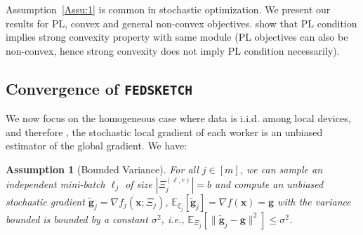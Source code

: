 \documentclass[11pt]{article}
\newtheorem{assumption}{Assumption}
\begin{document}
Assumption~\ref{Assu:1} is common in stochastic optimization. 
We present our results for PL, convex and general non-convex objectives. \citep{karimi2016linear} show that PL condition implies strong convexity property with same module (PL objectives can also be non-convex, hence strong convexity does not imply PL condition necessarily).

\vspace{-0.05in}
\subsection{Convergence of  \texttt{FEDSKETCH} } 
\vspace{-0.05in}
We now focus on the homogeneous case where data is i.i.d. among local devices, and therefore 
, the stochastic local gradient of each worker is an unbiased estimator of the global gradient.
We have:
\begin{assumption}[Bounded Variance]\label{Assu:1.5}
For all $j\in [m]$, we can sample an independent mini-batch $\ell_j$   of size $|\Xi_j^{(\ell,r)}| = b$ and compute an unbiased stochastic gradient  $\tilde{\mathbf{g}}_j = \nabla f_j(\boldsymbol{x}; \Xi_j)$, $\mathbb{E}_{\xi_j}[\tilde{\mathbf{g}}_j] = \nabla f(\boldsymbol{x})=\mathbf{g}$ with  the variance bounded is bounded by a constant $\sigma^2$, i.e., $
\mathbb{E}_{\Xi_j}\left[\|\tilde{\mathbf{g}}_j-\mathbf{g}\|^2\right]\leq \sigma^2$.
\end{assumption}
\end{document}
